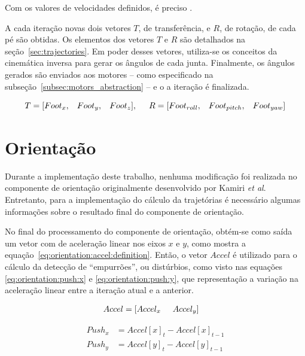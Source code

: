 Com os valores de velocidades definidos, é preciso .

A cada iteração novas dois vetores $T$, de transferência, e $R$, de rotação, de cada pé são obtidas. Os elementos dos vetores $T$ e $R$ são detalhados na seção~\ref{sec:trajectories}. Em poder desses vetores, utiliza-se os conceitos da cinemática inversa para gerar os ângulos de cada junta. Finalmente, os ângulos gerados são enviados aos motores -- como especificado na subseção~\ref{subsec:motors_abstraction} -- e o a iteração é finalizada.

\begin{equation}
\label{eq:trajectory_and_rotation_definition}
T = [Foot_x,\hspace{3mm}Foot_y,\hspace{3mm}Foot_z],\hspace{5mm}R = [Foot_{roll},\hspace{3mm}Foot_{pitch},\hspace{3mm}Foot_{yaw}]
\end{equation}

\section{Orientação}

Durante a implementação deste trabalho, nenhuma modificação foi realizada no componente de orientação originalmente desenvolvido por Kamiri \textit{et al}. Entretanto, para a implementação do cálculo da trajetórias é necessário algumas informações sobre o resultado final do componente de orientação.

No final do processamento do componente de orientação, obtém-se como saída um vetor com de aceleração linear nos eixos $x$ e $y$, como mostra a equação~\ref{eq:orientation:accel:definition}. Então, o vetor $Accel$ é utilizado para o cálculo da detecção de ``empurrões'', ou distúrbios, como visto nas equações \ref{eq:orientation:push:x} e \ref{eq:orientation:push:y}, que representação a variação na aceleração linear entre a iteração atual e a anterior.

\begin{align}
	Accel &= [Accel_x \hspace{5mm} Accel_y] \label{eq:orientation:accel:definition}
\end{align}

\begin{align}
	Push_x &= Accel[x]_t - Accel[x]_{t-1} 	 \label{eq:orientation:push:x}   \\
	Push_y &= Accel[y]_t - Accel[y]_{t-1}     \label{eq:orientation:push:y}
\end{align}

